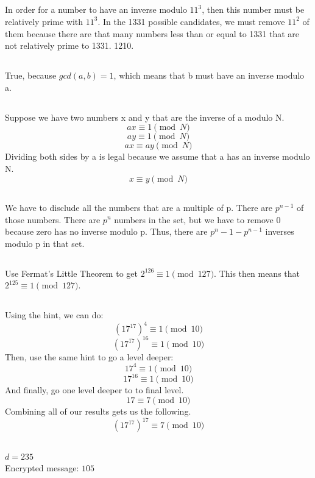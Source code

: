 \documentclass{article}
\begin{document}
\subsection{}
In order for a number to have an inverse modulo $11^3$, then this number must be relatively prime with $11^3$. In the 1331 possible candidates, we must remove $11^2$ of them because there are that many numbers less than or equal to 1331 that are not relatively prime to 1331. 1210. 
\subsection{}True, because $gcd(a,b)=1$, which means that b must have an inverse modulo a.
\subsection{}Suppose we have two numbers x and y that are the inverse of a modulo N. 
$$ax \equiv 1\pmod N$$
$$ay \equiv 1\pmod N$$
$$ax \equiv ay\pmod N$$
Dividing both sides by a is legal because we assume that a has an inverse modulo N.
$$x \equiv y \pmod N$$
\subsection{}We have to disclude all the numbers that are a multiple of p. There are $p^{n-1}$ of those numbers. There are $p^n$ numbers in the set, but we have to remove $0$ because zero has no inverse modulo p. Thus, there are $p^n-1-p^{n-1}$ inverses modulo p in that set. 
\subsection{}Use Fermat's Little Theorem to get $2^{126} \equiv 1 \pmod {127}$. This then means that $2^{125} \equiv 1 \pmod {127}$.
\subsection{}Using the hint, we can do:
$$(17^{17})^4 \equiv 1 \pmod {10}$$
$$(17^{17})^{16} \equiv 1 \pmod {10}$$
Then, use the same hint to go a level deeper:
$$17^4 \equiv 1 \pmod{10}$$
$$17^{16} \equiv 1 \pmod{10}$$
And finally, go one level deeper to to final level. 
$$17 \equiv 7 \pmod{10}$$
Combining all of our results gets us the following. 
$$(17^{17})^{17} \equiv 7 \pmod{10}$$
\subsection{}
$d=235$\\
Encrypted message: $105$
\end{document}
